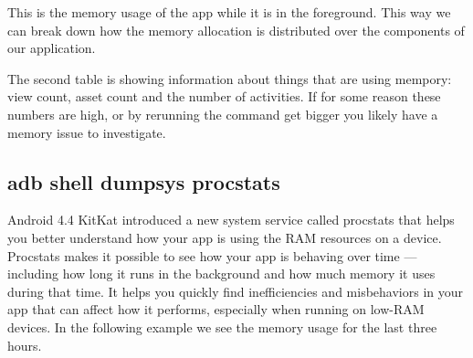This is the memory usage of the app while it is in the foreground. This way we can break down how the memory allocation is distributed over the components of our application. 

The second table is showing information about things that are using mempory: view count, asset count and the number of activities. If for some reason these numbers are high, or by rerunning the command get bigger you likely have a memory issue to investigate. 

\subsection{adb shell dumpsys procstats}
Android 4.4 KitKat introduced a new system service called procstats that helps you better understand how your app is using the RAM resources on a device. Procstats makes it possible to see how your app is behaving over time — including how long it runs in the background and how much memory it uses during that time. It helps you quickly find inefficiencies and misbehaviors in your app that can affect how it performs, especially when running on low-RAM devices. In the following example we see the memory usage for the last three hours.

